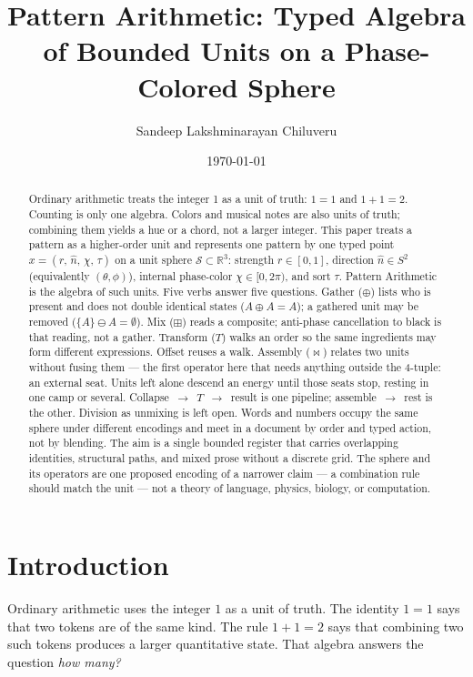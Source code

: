 \documentclass[12pt, a4paper]{article}
\title{Pattern Arithmetic: Typed Algebra of Bounded Units on a Phase-Colored Sphere}
\author{Sandeep Lakshminarayan Chiluveru}
\date{\today}
\begin{document}
\maketitle

\begin{abstract}
Ordinary arithmetic treats the integer 1 as a unit of truth: $1=1$ and $1+1=2$. Counting is only one algebra. Colors and musical notes are also units of truth; combining them yields a hue or a chord, not a larger integer. This paper treats a pattern as a higher-order unit and represents one pattern by one typed point
$x = (r,\,\hat n,\,\chi,\,\tau)$
on a unit sphere $\mathcal{S} \subset \mathbb{R}^3$:
strength $r \in [0, 1]$,
direction $\hat n \in S^2$ (equivalently $(\theta,\phi)$),
internal phase-color $\chi \in [0, 2\pi)$,
and sort $\tau$.
Pattern Arithmetic is the algebra of such units. Five verbs answer
five questions. Gather ($\oplus$) lists who is present and does not
double identical states ($A \oplus A = A$); a gathered unit may be
removed ($\{A\} \ominus A = \emptyset$). Mix ($\boxplus$) reads a
composite; anti-phase cancellation to black is that reading, not a
gather. Transform ($T$) walks an order so the same ingredients may
form different expressions. Offset reuses a walk. Assembly
($\bowtie$) relates two units without fusing them --- the first
operator here that needs anything outside the 4-tuple: an external
seat. Units left alone descend an energy until those seats stop,
resting in one camp or several. Collapse~$\to$~$T$~$\to$~result is
one pipeline; assemble~$\to$~rest is the other. Division as
unmixing is left open. Words and numbers occupy the same sphere under different encodings and meet in a document by order and typed action, not by blending. The aim is a single bounded register that carries overlapping identities, structural paths, and mixed prose without a discrete grid. The sphere and its operators are one proposed encoding of a narrower claim --- a combination rule should match the unit --- not a theory of language, physics, biology, or computation.
\end{abstract}

\section{Introduction}

Ordinary arithmetic uses the integer $1$ as a unit of truth.
The identity $1=1$ says that two tokens are of the same kind.
The rule $1+1=2$ says that combining two such tokens produces a
larger quantitative state. That algebra answers the question
\emph{how many?}
\end{document}
